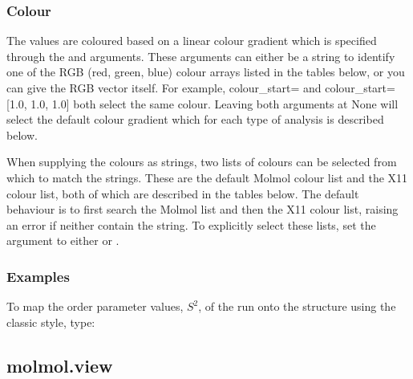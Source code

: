   
 \subsubsection{Colour} 

 The values are coloured based on a linear colour gradient which is specified through the  and  arguments.  These arguments can either be a string to identify one of the RGB (red, green, blue) colour arrays listed in the tables below, or you can give the RGB vector itself.  For example, colour\_start= and colour\_start=[1.0, 1.0, 1.0] both select the same colour.  Leaving both arguments at None will select the default colour gradient which for each type of analysis is described below. 
  

 When supplying the colours as strings, two lists of colours can be selected from which to match the strings.  These are the default Molmol colour list and the X11 colour list, both of which are described in the tables below.  The default behaviour is to first search the Molmol list and then the X11 colour list, raising an error if neither contain the string. To explicitly select these lists, set the  argument to either  or . 
  

  
 \subsubsection{Examples} 

 To map the order parameter values, $S^2$, of the run  onto the structure using the classic style, type: 
  




  

 \newpage 

 \subsection{molmol.view} 


